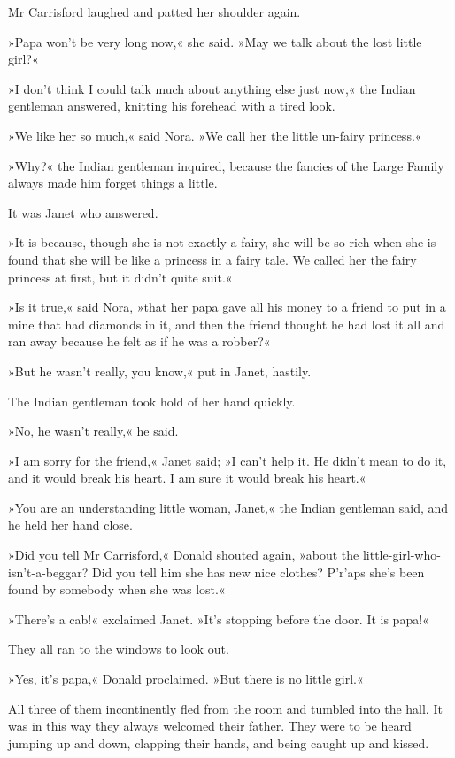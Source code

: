 Mr Carrisford laughed and patted her shoulder again.

»Papa won't be very long now,« she said. »May we talk about the lost little girl?«

»I don't think I could talk much about anything else just now,« the Indian gentleman answered, knitting his forehead with a tired look.

»We like her so much,« said Nora. »We call her the little un-fairy princess.«

»Why?« the Indian gentleman inquired, because the fancies of the Large Family always made him forget things a little.

It was Janet who answered.

»It is because, though she is not exactly a fairy, she will be so rich when she is found that she will be like a princess in a fairy tale. We called her the fairy princess at first, but it didn't quite suit.«

»Is it true,« said Nora, »that her papa gave all his money to a friend to put in a mine that had diamonds in it, and then the friend thought he had lost it all and ran away because he felt as if he was a robber?«

»But he wasn't really, you know,« put in Janet, hastily.

The Indian gentleman took hold of her hand quickly.

»No, he wasn't really,« he said.

»I am sorry for the friend,« Janet said; »I can't help it. He didn't mean to do it, and it would break his heart. I am sure it would break his heart.«

»You are an understanding little woman, Janet,« the Indian gentleman said, and he held her hand close.

»Did you tell Mr Carrisford,« Donald shouted again, »about the little-girl-who-isn't-a-beggar? Did you tell him she has new nice clothes? P'r'aps she's been found by somebody when she was lost.«

»There's a cab!« exclaimed Janet. »It's stopping before the door. It is papa!«

They all ran to the windows to look out.

»Yes, it's papa,« Donald proclaimed. »But there is no little girl.«

All three of them incontinently fled from the room and tumbled into the hall. It was in this way they always welcomed their father. They were to be heard jumping up and down, clapping their hands, and being caught up and kissed.


